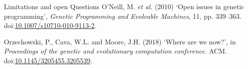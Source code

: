 \documentclass[
  ignorenonframetext,
]{beamer}
\newenvironment{cslreferences}%
  {}%
  {\par}
\begin{document}
\begin{frame}{Limitations and open Questions}
\begin{cslreferences}
\leavevmode\hypertarget{ref-open_issues_gp}{}%
O'Neill, M. \emph{et al.} (2010) `Open issues in genetic programming',
\emph{Genetic Programming and Evolvable Machines}, 11, pp. 339--363.
doi:\href{https://doi.org/10.1007/s10710-010-9113-2}{10.1007/s10710-010-9113-2}.

\leavevmode\hypertarget{ref-Orzechowski_2018}{}%
Orzechowski, P., Cava, W.L. and Moore, J.H. (2018) `Where are we now?',
in \emph{Proceedings of the genetic and evolutionary computation
conference}. ACM.
doi:\href{https://doi.org/10.1145/3205455.3205539}{10.1145/3205455.3205539}.
\end{cslreferences}
\end{frame}
\end{document}
